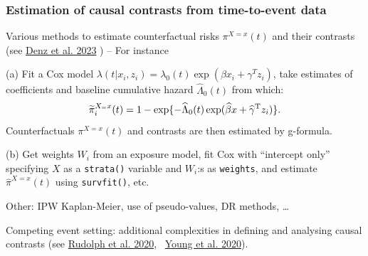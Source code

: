 \documentclass[12pt,dvipsnames,t,aspectratio=169, handout%
]{beamer}
\begin{document}
\begin{frame}
\frametitle{\large Estimation of causal contrasts from time-to-event data}
\bi
\item
Various methods to estimate counterfactual %
risks $\pi^{X=x}(t)$ and their contrasts 
({\small see \href{https://doi.org/10.1002/sim.9681}{\color{blue}Denz et al. 2023} }) -- For instance
\medskip
\item[(a)] 
Fit a Cox model $\lambda(t|x_i, z_i) = \lambda_0(t)\exp(\beta x_i + \gamma^{T}z_i)$,
take estimates of coefficients and baseline cumulative hazard $\widehat\Lambda_0(t)$
from which:
$$ %
 \widetilde{\pi}_i^{X_=x}(t) = 1 - \exp \{ -\widehat\Lambda_0(t)\exp(\widehat\beta x + \widehat\gamma^{\small{\text{T}}} z_i) \}  .
$$ %
Counterfactuals $ {\pi}^{X=x}(t)$ and contrasts are then estimated by g-formula.
\medskip
\item[(b)]
Get weights $W_i$ from an exposure model, fit Cox with ``intercept only'' 
specifying $X$ as a \texttt{strata()} variable and $W_i$:s as \texttt{weights}, and estimate $\widehat{\pi}^{X=x}(t)$
using \texttt{survfit()}, etc.
\medskip
\item Other: IPW Kaplan-Meier, use of pseudo-values, DR methods, \dots
\medskip
\item Competing event setting: additional complexities in defining and analysing causal contrasts
({\small see \href{https://doi.org/10.1007/s40471-020-00240-7}{\color{blue}Rudolph et al. 2020}, \ 
\href{https://doi.org/10.1002/sim.8471}{\color{blue}Young et al. 2020}}).    
\ei
\end{frame}
\end{document}
